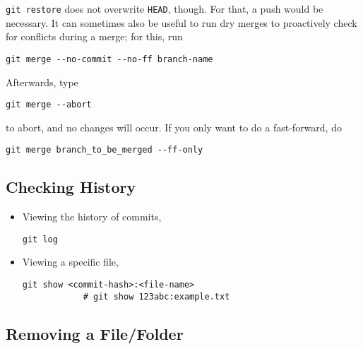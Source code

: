 \documentclass[12pt, a4paper]{article}
\numberwithin{equation}{section}
\theoremstyle{definition}
\theoremstyle{definition}
\begin{document}
		\texttt{git restore} does not overwrite \texttt{HEAD}, though. For that, a push would be necessary.  It can sometimes also be useful to run dry merges to proactively check for conflicts during a merge; for this, run
		
		\begin{lstlisting}[style=mystylebash, label=alg:git__dry_merge, xleftmargin=\parindent]
			git merge --no-commit --no-ff branch-name
		\end{lstlisting}

		Afterwards, type 

		\begin{lstlisting}[style=mystylebash, label=alg:git__abort_merge, xleftmargin=\parindent]
			git merge --abort
		\end{lstlisting}
		
		to abort, and no changes will occur. If you only want to do a fast-forward, do 

		\begin{lstlisting}[style=mystylebash, label=alg:git__ff_only, xleftmargin=\parindent]
			git merge branch_to_be_merged --ff-only
		\end{lstlisting}

	\subsection{Checking History}

	\begin{itemize}
		\item Viewing the history of commits,
		
		\begin{lstlisting}[style=mystylebash, label=alg:history1, xleftmargin=\parindent]
			git log
		\end{lstlisting}
	
		\item Viewing a specific file,
		
		\begin{lstlisting}[style=mystylebash, label=alg:history1, xleftmargin=\parindent]
			git show <commit-hash>:<file-name>
			# git show 123abc:example.txt
		\end{lstlisting}
	
	\end{itemize}
	
	\subsection{Removing a File/Folder}
	
\end{document}
